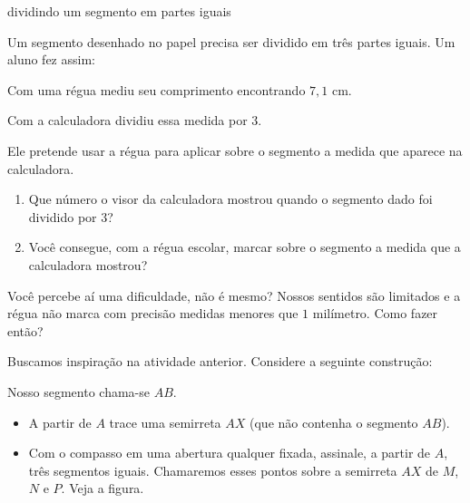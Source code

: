 \begin{task}{dividindo um segmento em partes iguais}

Um segmento desenhado no papel precisa ser dividido em três partes iguais. Um aluno fez assim:

Com uma régua mediu seu comprimento encontrando \(7{,}1\) cm.

Com a calculadora dividiu essa medida por $3$.

Ele pretende usar a régua para aplicar sobre o segmento a medida que aparece na calculadora.
\begin{enumerate}
\item {} 
Que número o visor da calculadora mostrou quando o segmento dado foi dividido por $3$?

\item {} 
Você consegue, com a régua escolar, marcar sobre o segmento a medida que a calculadora mostrou?

\end{enumerate}

Você percebe aí uma dificuldade, não é mesmo? Nossos sentidos são limitados e a régua não marca com precisão medidas menores que $1$ milímetro. Como fazer então?

Buscamos  inspiração na atividade anterior. Considere a seguinte construção:

Nosso segmento chama-se \(AB\).
\begin{itemize}
\item {} 
A partir de \(A\) trace uma semirreta \(AX\) (que não contenha o segmento \(AB\)).

\item {} 
Com o compasso em uma abertura qualquer fixada, assinale, a partir de \(A\), três segmentos iguais. Chamaremos esses pontos sobre a semirreta \(AX\) de \(M\), \(N\) e \(P\). Veja a figura.


\end{itemize}
\end{task}
